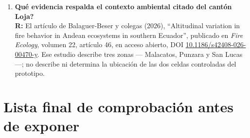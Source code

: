 \documentclass[11pt,a4paper]{article}
\begin{document}
\begin{enumerate}[leftmargin=1.2cm, itemsep=8pt, label=\textbf{P\arabic*.}]
\item \textbf{\textquestiondown Qu\'e evidencia respalda el contexto
ambiental citado del cant\'on Loja?}\\
\textbf{R:} El art\'iculo de Balaguer-Beser y colegas (2026),
``Altitudinal variation in fire behavior in Andean ecosystems in
southern Ecuador'', publicado en \textit{Fire Ecology}, volumen 22,
art\'iculo 46, en acceso abierto, DOI
\href{https://doi.org/10.1186/s42408-026-00470-y}{10.1186/s42408-026-00470-y}.
Ese estudio describe tres zonas --- Malacatos, Punzara y San Lucas ---;
no describe ni determina la ubicaci\'on de las dos celdas controladas
del prototipo.

\end{enumerate}

\newpage

\section{Lista final de comprobaci\'on antes de exponer}
\end{document}
